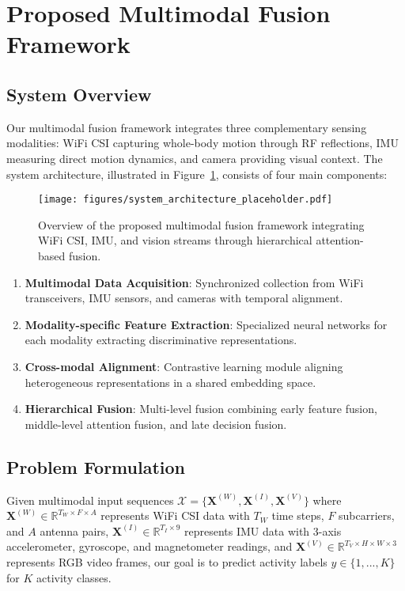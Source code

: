 \documentclass[journal]{IEEEtran}
\begin{document}
\section{Proposed Multimodal Fusion Framework}

\subsection{System Overview}

Our multimodal fusion framework integrates three complementary sensing modalities: WiFi CSI capturing whole-body motion through RF reflections, IMU measuring direct motion dynamics, and camera providing visual context. The system architecture, illustrated in Figure~\ref{fig:system_architecture}, consists of four main components:

\begin{figure}[t]
\centering
\texttt{[image: figures/system\_architecture\_placeholder.pdf]}
\caption{Overview of the proposed multimodal fusion framework integrating WiFi CSI, IMU, and vision streams through hierarchical attention-based fusion.}
\label{fig:system_architecture}
\end{figure}

\begin{enumerate}
\item \textbf{Multimodal Data Acquisition}: Synchronized collection from WiFi transceivers, IMU sensors, and cameras with temporal alignment.

\item \textbf{Modality-specific Feature Extraction}: Specialized neural networks for each modality extracting discriminative representations.

\item \textbf{Cross-modal Alignment}: Contrastive learning module aligning heterogeneous representations in a shared embedding space.

\item \textbf{Hierarchical Fusion}: Multi-level fusion combining early feature fusion, middle-level attention fusion, and late decision fusion.
\end{enumerate}

\subsection{Problem Formulation}

Given multimodal input sequences $\mathcal{X} = \{\mathbf{X}^{(W)}, \mathbf{X}^{(I)}, \mathbf{X}^{(V)}\}$ where $\mathbf{X}^{(W)} \in \mathbb{R}^{T_W \times F \times A}$ represents WiFi CSI data with $T_W$ time steps, $F$ subcarriers, and $A$ antenna pairs, $\mathbf{X}^{(I)} \in \mathbb{R}^{T_I \times 9}$ represents IMU data with 3-axis accelerometer, gyroscope, and magnetometer readings, and $\mathbf{X}^{(V)} \in \mathbb{R}^{T_V \times H \times W \times 3}$ represents RGB video frames, our goal is to predict activity labels $y \in \{1, ..., K\}$ for $K$ activity classes.
\end{document}
